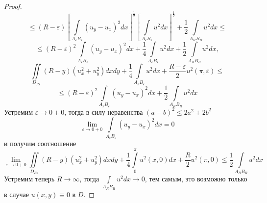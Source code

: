\documentclass[a4paper, 9pt]{article}
\begin{document}
\begin{proof}
\begin{equation*}
		\end{equation*}
		\begin{equation*}
			\leq \left(R - \varepsilon\right) \left[\int\limits_{A_\varepsilon B_\varepsilon} \left( u_y - u_x\right)^2 dx \right]^{\frac12} \left[\int\limits_{A_\varepsilon B_\varepsilon} u^2 dx \right]^{\frac12} + \dfrac12 \int\limits_{A_RB_R} u^2 dx \leq
		\end{equation*}
		\begin{equation*}
			\leq \left(R - \varepsilon\right)^2 \int\limits_{A_\varepsilon B_\varepsilon} \left( u_y - u_x\right)^2 dx + \dfrac14 \int\limits_{A_\varepsilon B_\varepsilon} u^2 dx +\dfrac12 \int\limits_{A_RB_R} u^2 dx, 
		\end{equation*}
		\begin{equation*}
			\iint\limits_{D_{R\varepsilon}} \left(R - y\right) \left(u_x^2 + u_y^2\right) dx dy + \dfrac{1}{4}\int\limits_{A_\varepsilon B_\varepsilon} u^2 dx +\dfrac{R - \varepsilon}{2}u^2(\pi, \varepsilon) \leq 
		\end{equation*}
		\begin{equation*}
			\leq \left(R - \varepsilon\right)^2 \int\limits_{A_\varepsilon B_\varepsilon} \left( u_y - u_x\right)^2 dx  +\dfrac12 \int\limits_{A_RB_R} u^2 dx
		\end{equation*}
		Устремим $\varepsilon \to 0 + 0$, тогда в силу неравенства $(a-b)^2 \leq 2a^2 + 2b^2$
		\begin{equation*}
			\lim\limits_{\varepsilon \to 0 + 0} \int\limits_{A_\varepsilon B_\varepsilon} \left(u_y - u_x\right)^2 dx = 0
		\end{equation*}
		и получим соотношение
		\begin{equation*}
			\lim\limits_{\varepsilon \to 0 + 0} \iint\limits_{D_{R\varepsilon}} \left(R - y\right) \left(u_x^2 + u_y^2 \right) dx dy + \dfrac14 \int\limits_0^\pi u^2(x,0) dx + \dfrac{R}{2}u^2(\pi,0) \leq \dfrac12 \int\limits_{A_RB_R} u^2 dx
		\end{equation*}
		Устремим теперь $R \to \infty$, тогда $\int\limits_{A_RB_R} u^2 dx \to 0$, тем самым, это возможно только в случае $u(x,y) \equiv 0$ в $\overline{D}$.
	\end{proof}
	
\end{document}
